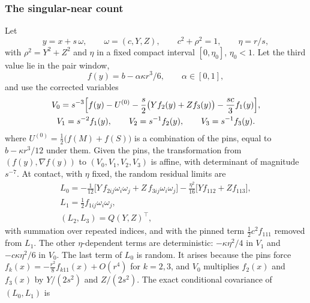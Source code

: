 \subsubsection{The singular-near count}

\begin{lemma}\label{lem:selection-singchart}
Let
\begin{equation}\label{eq:selection-singpt}
y=x+s\,\omega,\qquad\omega=(c,Y,Z),\qquad c^2+\rho^2=1,\qquad\eta=r/s,
\end{equation}
with $\rho^2=Y^2+Z^2$ and $\eta$ in a fixed compact interval $[0,\eta_0]$, $\eta_0<1$. Let the third value lie in the pair window,
\begin{equation}\label{eq:selection-window}
f(y)=b-\alpha\kappa r^3/6,\qquad\alpha\in[0,1],
\end{equation}
and use the corrected variables
\begin{gather}
V_0=s^{-3}\Bigl[f(y)-U^{(0)}-\frac s2\bigl(Yf_2(y)+Zf_3(y)\bigr)-\frac{sc}3f_1(y)\Bigr],\label{eq:selection-V0}\\
V_1=s^{-2}f_1(y),\qquad V_2=s^{-1}f_2(y),\qquad V_3=s^{-1}f_3(y).\label{eq:selection-V123}
\end{gather}
where $U^{(0)}=\frac12\bigl(f(M)+f(S)\bigr)$ is a combination of the pins, equal to $b-\kappa r^3/12$ under them. Given the pins, the transformation from $(f(y),\nabla f(y))$ to $(V_0,V_1,V_2,V_3)$ is affine, with determinant of magnitude $s^{-7}$. At contact, with $\eta$ fixed, the random residual limits are
\begin{gather}
L_0=-\tfrac1{12}\bigl[Y\,f_{2ij}\omega_i\omega_j+Z\,f_{3ij}\omega_i\omega_j\bigr]-\tfrac{\eta^2}{16}\bigl[Yf_{112}+Zf_{113}\bigr],\label{eq:selection-L0}\\
L_1=\tfrac12f_{1ij}\omega_i\omega_j,\label{eq:selection-L1s}\\
(L_2,L_3)=Q(Y,Z)^{\top},\label{eq:selection-L23}
\end{gather}
with summation over repeated indices, and with the pinned term $\frac12c^2f_{111}$ removed from $L_1$. The other $\eta$-dependent terms are deterministic: $-\kappa\eta^2/4$ in $V_1$ and $-c\kappa\eta^2/6$ in $V_0$. The last term of $L_0$ is random. It arises because the pins force $f_k(x)=-\frac{r^2}8f_{k11}(x)+O(r^4)$ for $k=2,3$, and $V_0$ multiplies $f_2(x)$ and $f_3(x)$ by $Y/(2s^2)$ and $Z/(2s^2)$. The exact conditional covariance of $(L_0,L_1)$ is
\begin{equation}\label{eq:selection-C01}

\end{equation}
\end{lemma}
